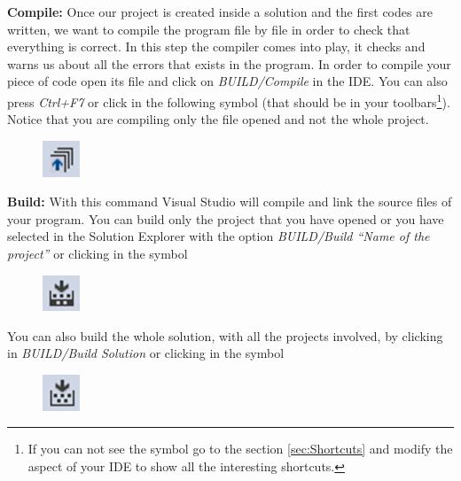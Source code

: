 \begin{enumerate}
    \textbf{Compile:} Once our project is created inside a solution and the first codes are written, we want to compile the program file by file in order to check that everything is correct. In this step the compiler comes into play, it checks and warns us about all the errors that exists in the program. In order to compile your piece of code open its file and click on \textit{BUILD/Compile} in the IDE. You can also press \textit{Ctrl+F7} or click in the following symbol (that should be in your toolbars\footnote{If you can not see the symbol go to the section \ref{sec:Shortcuts} and modify the aspect of your IDE to show all the interesting shortcuts.}). Notice that you are compiling only the file opened and not the whole project.
    
    \begin{figure}[H]
        \centering
        \includegraphics[width= 0.1\textwidth]{Figures/CompileSymbol}
    \end{figure}
    
    \textbf{Build:} With this command Visual Studio will compile and link the source files of your program. You can build only the project that you have opened or you have selected in the Solution Explorer with the option \textit{BUILD/Build ``Name of the project''} or clicking in the symbol 
    
    \begin{figure}[H]
        \centering
        \includegraphics[width= 0.1\textwidth]{Figures/Build1Symbol}
    \end{figure}
    
    You can also build the whole solution, with all the projects involved, by clicking in \textit{BUILD/Build Solution} or clicking in the symbol 
    
    \begin{figure}[H]
        \centering
        \includegraphics[width= 0.1\textwidth]{Figures/Build2Symbol}
    \end{figure}
    

\end{enumerate}
